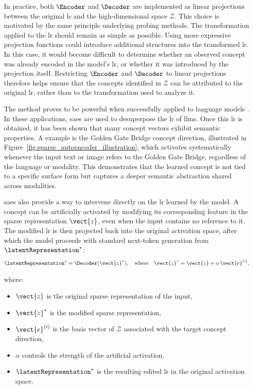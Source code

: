 In practice, both $\Encoder$ and $\Decoder$ are implemented as linear projections between the original \gls{ls} and the high-dimensional space $\mathcal{Z}$. This choice is motivated by the same principle underlying probing methods. The transformation applied to the \gls{lr} should remain as simple as possible.
Using more expressive projection functions could introduce additional structures into the transformed \gls{lr}. In this case, it would become difficult to determine whether an observed concept was already encoded in the model's \gls{lr}, or whether it was introduced by the projection itself. Restricting $\Encoder$ and $\Decoder$ to linear projections therefore helps ensure that the concepts identified in $\mathcal{Z}$ can be attributed to the original \gls{lr}, rather than to the transformation used to analyze it.

The method proves to be powerful when successfully applied to language models \parencite{templeton2024scaling}.
In these applications, \glspl{sae} are used to desuperpose the \gls{lr} of \glspl{llm}.
Once this \gls{lr} is obtained, it has been shown that many concept vectors exhibit semantic properties.
A example is the Golden Gate Bridge concept direction, illustrated in Figure~\ref{fig:sparse_autoencoder_illustration}, which activates systematically whenever the input text or image refers to the Golden Gate Bridge, regardless of the language or modality.
This demonstrates that the learned concept is not tied to a specific surface form but captures a deeper semantic abstraction shared across modalities.



\glspl{sae} also provide a way to intervene directly on the \gls{lr} learned by the model.
A concept can be artificially activated by modifying its corresponding feature in the sparse representation $\vect{z}$, even when the input contains no reference to it.
The modified \gls{lr} is then projected back into the original activation space, after which the model proceeds with standard next-token generation from $\latentRepresentation^{*}$:
\[
\latentRepresentation^{*} = \Decoder(\vect{z}^*), \quad \text{where} \quad \vect{z}^* = \vect{z} + \alpha \, \vect{e}^{(i)},
\]

where:
\begin{itemize}
    \item $\vect{z}$ is the original sparse representation of the input,
    \item $\vect{z}^*$ is the modified sparse representation,
    \item $\vect{e}^{(i)}$ is the basis vector of $\mathcal{Z}$ associated with the target concept direction,
    \item $\alpha$ controls the strength of the artificial activation,
    \item $\latentRepresentation^{*}$ is the resulting edited \gls{lr} in the original activation space.
\end{itemize}

